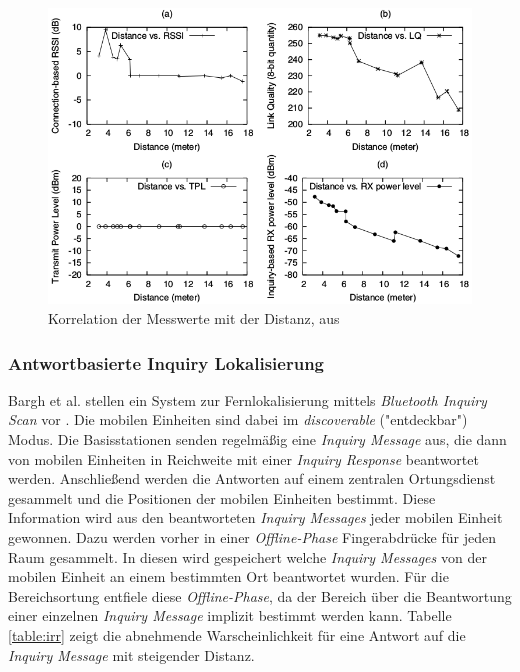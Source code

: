 \begin{figure}[h]
  \centering
	\includegraphics[width=\textwidth]{images/bluetoothmess.png}
  \caption{Korrelation der Messwerte mit der Distanz, aus \cite{hossain2007comprehensive}}
  \label{fig:bluetoothmess}
\end{figure}

\subsubsection{Antwortbasierte Inquiry Lokalisierung}
\label{ch:Vorherige:sec:irr}
Bargh et al. stellen ein System zur Fernlokalisierung mittels \emph{Bluetooth Inquiry Scan} vor \cite{bargh2008indoor}.
Die mobilen Einheiten sind dabei im \emph{discoverable} ("{}entdeckbar"{}) Modus.
Die Basisstationen senden regelmäßig eine \emph{Inquiry Message} aus, die dann von mobilen Einheiten in Reichweite mit einer \emph{Inquiry Response} beantwortet werden. 
Anschließend werden die Antworten auf einem zentralen Ortungsdienst gesammelt und die Positionen der mobilen Einheiten bestimmt.
Diese Information wird aus den beantworteten \emph{Inquiry Messages} jeder mobilen Einheit gewonnen.
Dazu werden vorher in einer \emph{Offline-Phase} Fingerabdrücke für jeden Raum gesammelt.
In diesen wird gespeichert welche \emph{Inquiry Messages} von der mobilen Einheit an einem bestimmten Ort beantwortet wurden.
Für die Bereichsortung entfiele diese \emph{Offline-Phase}, da der Bereich über die Beantwortung einer einzelnen \emph{Inquiry Message} implizit bestimmt werden kann.
Tabelle \ref{table:irr} zeigt die abnehmende Warscheinlichkeit für eine Antwort auf die \emph{Inquiry Message} mit steigender Distanz.

